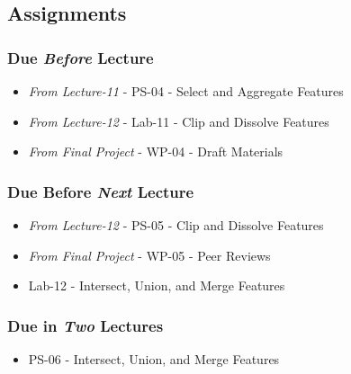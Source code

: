 \documentclass[
]{book}
\providecommand{\tightlist}{%
  \setlength{\itemsep}{0pt}\setlength{\parskip}{0pt}}
\begin{document}
\hypertarget{assignments-14}{%
\subsection*{Assignments}\label{assignments-14}}

\hypertarget{due-before-lecture-12}{%
\subsubsection*{\texorpdfstring{Due \emph{Before} Lecture}{Due Before Lecture}}\label{due-before-lecture-12}}

\begin{itemize}
\tightlist
\item
  \emph{From Lecture-11} - PS-04 - Select and Aggregate Features
\item
  \emph{From Lecture-12} - Lab-11 - Clip and Dissolve Features
\item
  \emph{From Final Project} - WP-04 - Draft Materials
\end{itemize}

\hypertarget{due-before-next-lecture-11}{%
\subsubsection*{\texorpdfstring{Due Before \emph{Next} Lecture}{Due Before Next Lecture}}\label{due-before-next-lecture-11}}

\begin{itemize}
\tightlist
\item
  \emph{From Lecture-12} - PS-05 - Clip and Dissolve Features
\item
  \emph{From Final Project} - WP-05 - Peer Reviews
\item
  Lab-12 - Intersect, Union, and Merge Features
\end{itemize}

\hypertarget{due-in-two-lectures-7}{%
\subsubsection*{\texorpdfstring{Due in \emph{Two} Lectures}{Due in Two Lectures}}\label{due-in-two-lectures-7}}

\begin{itemize}
\tightlist
\item
  PS-06 - Intersect, Union, and Merge Features
\end{itemize}
\end{document}

